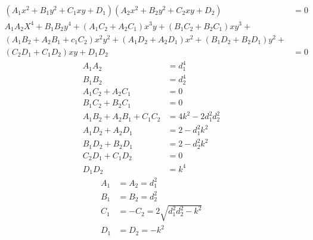 \documentclass{article}
\begin{document}
\begin{align*}
  (A_1 x^2 + B_1 y^2 + C_1 x y + D_1)(A_2 x^2 + B_2 y^2 + C_2 x y + D_2) &= 0\\
  A_1 A_2 X^4 + B_1 B_2 y^4 + (A_1 C_2 + A_2 C_1) x^3 y + (B_1 C_2 + B_2 C_1) x y^3 + \\
  (A_1 B_2 + A_2 B_1 + c_1 C_2) x^2 y^2 + (A_1 D_2 + A_2 D_1) x^2 + (B_1 D_2 + B_2 D_1) y^2 + \\
  (C_2 D_1 + C_1 D_2) x y + D_1 D_2 &= 0
\end{align*}
\begin{align*}
  A_1 A_2 &= d_1^4\\
  B_1 B_2 &= d_2^4\\
  A_1 C_2 + A_2 C_1 &= 0\\
  B_1 C_2 + B_2 C_1 &= 0\\
  A_1 B_2 + A_2 B_1 + C_1 C_2 &= 4 k^2 - 2 d_1^2 d_2^2\\
  A_1 D_2 + A_2 D_1 &= 2 -d_1^2 k^2\\
  B_1 D_2 + B_2 D_1 &= 2 -d_2^2 k^2\\
  C_2 D_1 + C_1 D_2 &= 0\\
  D_1 D_2 &= k^4
\end{align*}
\begin{align*}
  A_1 &= A_2 = d_1^2\\
  B_1 &= B_2 = d_2^2\\
  C_1 &= -C_2 = 2 \sqrt{d_1^2 d_2^2 - k^2}\\
  D_1 &= D_2 = -k^2\\
\end{align*}
\end{document}

